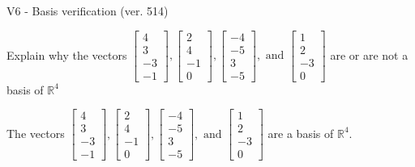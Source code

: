 \begin{exercise}
  \begin{exerciseTitle}V6 - Basis verification (ver. 514)\end{exerciseTitle}
  \begin{exerciseStatement}
    Explain why the vectors \(\left[\begin{array}{r}
4 \\
3 \\
-3 \\
-1
\end{array}\right] , \left[\begin{array}{r}
2 \\
4 \\
-1 \\
0
\end{array}\right] , \left[\begin{array}{r}
-4 \\
-5 \\
3 \\
-5
\end{array}\right] , \text{ and } \left[\begin{array}{r}
1 \\
2 \\
-3 \\
0
\end{array}\right]\) are or are not a basis of \(\mathbb{R}^4\)	


  \end{exerciseStatement}
  \begin{exerciseAnswer}
   The vectors \(\left[\begin{array}{r}
4 \\
3 \\
-3 \\
-1
\end{array}\right] , \left[\begin{array}{r}
2 \\
4 \\
-1 \\
0
\end{array}\right] , \left[\begin{array}{r}
-4 \\
-5 \\
3 \\
-5
\end{array}\right] , \text{ and } \left[\begin{array}{r}
1 \\
2 \\
-3 \\
0
\end{array}\right]\) 
  	 are  a basis of \(\mathbb{R}^4\).
  


  \end{exerciseAnswer}
\end{exercise}